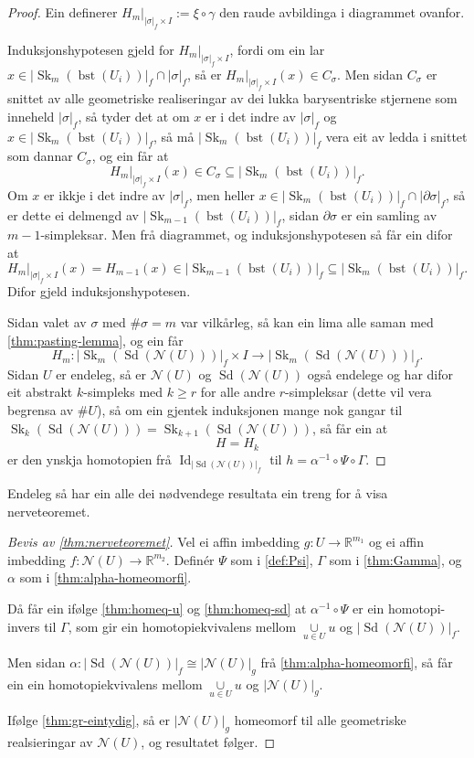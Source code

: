 \documentclass[a4paper, 12pt, norsk]{article}
\theoremstyle{plain}
\theoremstyle{definition}
\newcommand{\Rb}{\mathbb{R}}
\newcommand{\Nc}{\mathcal{N}}
\newcommand{\intersect}{ \mathop{\cap}\limits }
\newcommand{\union}{ \mathop{\cup}\limits }
\newcommand{\gr}[1]{ \lvert #1 \rvert } %
\DeclareMathOperator{\Sd}{Sd} %
\DeclareMathOperator{\bst}{bst} %
\DeclareMathOperator{\Sk}{Sk} %
\DeclareMathOperator{\Id}{Id} %
\begin{document}
\begin{proof}
	Ein definerer \( H_m|_{\gr{\sigma}_f \times I} := \xi \circ \gamma \) den raude avbildinga i diagrammet ovanfor.

	Induksjonshypotesen gjeld for \( H_m|_{\gr{\sigma}_f \times I} \), fordi om ein lar \( x \in \gr{\Sk_m(\bst(U_i))}_f \intersect \gr{\sigma}_f \), så er \( H_m|_{\gr{\sigma}_f \times I}(x) \in C_\sigma \). Men sidan \( C_\sigma \) er snittet av alle geometriske realiseringar av dei lukka barysentriske stjernene som inneheld \( \gr{\sigma}_f \), så tyder det at om \( x \) er i det indre av \( \gr{\sigma}_f \) og \( x \in \gr{\Sk_m(\bst(U_i))}_f \), så må \( \gr{\Sk_m(\bst(U_i))}_f \) vera eit av ledda i snittet som dannar \( C_\sigma \), og ein får at
	\[
		H_m|_{\gr{\sigma}_f \times I}(x) \in C_\sigma \subseteq \gr{\Sk_m(\bst(U_i))}_f.
	\]
	Om \( x \) er ikkje i det indre av \( \gr{\sigma}_f \), men heller \( x \in \gr{\Sk_m(\bst(U_i))}_f \intersect \gr{\partial\sigma}_f \), så er dette ei delmengd av \( \gr{\Sk_{m-1}(\bst(U_i))}_f \), sidan \( \partial\sigma \) er ein samling av \( m-1 \)-simpleksar. Men frå diagrammet, og induksjonshypotesen så får ein difor at
	\[
		H_m|_{\gr{\sigma}_f \times I}(x) = H_{m-1}(x) \in \gr{\Sk_{m-1}(\bst(U_i))}_f \subseteq \gr{\Sk_{m}(\bst(U_i))}_f.
	\]
	Difor gjeld induksjonshypotesen.

	Sidan valet av \( \sigma \) med \( \#\sigma = m \) var vilkårleg, så kan ein lima alle saman med \autoref{thm:pasting-lemma}, og ein får
	\[
		H_m : \gr{\Sk_m(\Sd(\Nc(U)))}_f \times I \to \gr{\Sk_m(\Sd(\Nc(U)))}_f.
	\]
	Sidan \( U \) er endeleg, så er \( \Nc(U) \) og \( \Sd(\Nc(U)) \) også endelege og har difor eit abstrakt \( k \)-simpleks med \( k \geq r \) for alle andre \( r \)-simpleksar (dette vil vera begrensa av \( \#U \)), så om ein gjentek induksjonen mange nok gangar til \( \Sk_{k}(\Sd(\Nc(U))) = \Sk_{k+1}(\Sd(\Nc(U))) \), så får ein at
	\[
		H = H_k
	\]
	er den ynskja homotopien frå \( \Id_{\gr{\Sd(\Nc(U))}_f} \) til \( h = \alpha^{-1} \circ \Psi \circ \Gamma \).
\end{proof}

Endeleg så har ein alle dei nødvendege resultata ein treng for å visa nerveteoremet.

\begin{proof}[Bevis av \autoref{thm:nerveteoremet}]
	Vel ei affin imbedding \( g: U \to \Rb^{m_1} \) og ei affin imbedding \( f: \Nc(U) \to \Rb^{m_2} \). Definér \( \Psi \) som i \autoref{def:Psi}, \( \Gamma \) som i \autoref{thm:Gamma}, og \( \alpha \) som i \autoref{thm:alpha-homeomorfi}.

	Då får ein ifølge \autoref{thm:homeq-u} og \autoref{thm:homeq-sd} at \( \alpha^{-1} \circ \Psi \) er ein homotopi-invers til \( \Gamma \), som gir ein homotopiekvivalens mellom \( \union_{u \in U} u \) og \( \gr{\Sd(\Nc(U))}_f \).

	Men sidan \( \alpha : \gr{\Sd(\Nc(U))}_f \cong \gr{\Nc(U)}_g \) frå \autoref{thm:alpha-homeomorfi}, så får ein ein homotopiekvivalens mellom \( \union_{u \in U} u \) og \( \gr{\Nc(U)}_g \).

	Ifølge \autoref{thm:gr-eintydig}, så er \( \gr{\Nc(U)}_g \) homeomorf til alle geometriske realsieringar av \( \Nc(U) \), og resultatet følger.
\end{proof}
\end{document}
